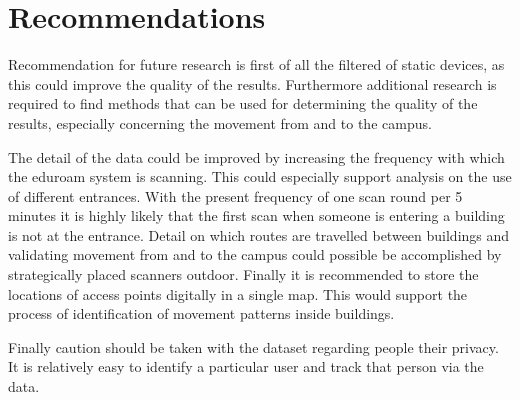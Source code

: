 \chapter{Recommendations}
Recommendation for future research is first of all the filtered of static devices, as this could improve the quality of the results. Furthermore additional research is required to find methods that can be used for determining the quality of the results, especially concerning the movement from and to the campus.

The detail of the data could be improved by increasing the frequency with which the eduroam system is scanning. This could especially support analysis on the use of different entrances. With the present frequency of one scan round per 5 minutes it is highly likely that the first scan when someone is entering a building is not at the entrance. Detail on which routes are travelled between buildings and validating movement from and to the campus could possible be accomplished by strategically placed scanners outdoor. Finally it is recommended to store the locations of access points digitally in a single map. This would support the process of identification of movement patterns inside buildings. 

Finally caution should be taken with the dataset regarding people their privacy. It is relatively easy to identify a particular user and track that person via the data.
